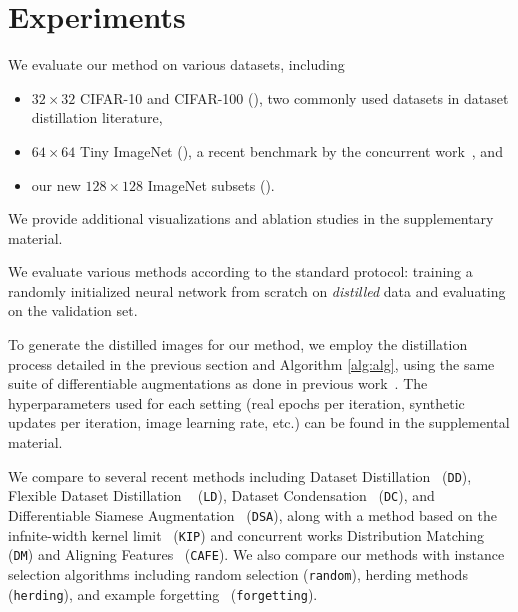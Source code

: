 \documentclass[main.tex]{subfiles}
\begin{document}
\section{Experiments}
We evaluate our method on various datasets, including \begin{itemize}[topsep=1pt, partopsep=9pt, itemsep=-1pt, parsep=0.5ex]
    \item $32\times32$ CIFAR-10 and CIFAR-100 (), two commonly used datasets in dataset distillation literature,
    \item $64\times 64$ Tiny ImageNet (), a recent benchmark by the concurrent work~\cite{dm}, and 
    \item our new $128 \times 128$ ImageNet subsets ().
\end{itemize}
We provide additional visualizations and ablation studies in the supplementary material. 


We evaluate various methods according to the standard protocol: training a randomly initialized neural network from scratch on \emph{distilled} data and evaluating on the validation set. %

To generate the distilled images for our method, we employ the distillation process detailed in the previous section and Algorithm \ref{alg:alg}, using the same suite of differentiable augmentations as done in previous work~\cite{dsa,dm}. The hyperparameters used for each setting (real epochs per iteration, synthetic updates per iteration, image learning rate, etc.) can be found in the supplemental material. 





We compare to several recent methods including Dataset Distillation~\cite{dd} (\texttt{DD}), Flexible Dataset Distillation ~\cite{bohdal2020flexible} (\texttt{LD}), Dataset Condensation~\cite{dc} (\texttt{DC}), and Differentiable Siamese Augmentation~\cite{dsa} (\texttt{DSA}), along with a method based on the infnite-width kernel limit~\citep{nguyen2020dataset,nguyen2021dataset} (\texttt{KIP}) and concurrent works Distribution Matching~\cite{dm} (\texttt{DM}) and Aligning Features~\cite{wang2022cafe} (\texttt{CAFE}). We also compare our methods with instance selection algorithms including random selection (\texttt{random}), herding methods~\cite{chen2010super} (\texttt{herding}), and example forgetting~\cite{toneva2018empirical} (\texttt{forgetting}). 
\end{document}
